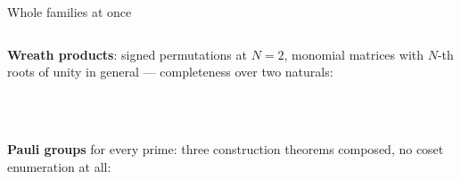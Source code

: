 \begin{frame}{Whole families at once}
\renewcommand{\AgdaCodeStyle}{\footnotesize}
\begin{columns}[c]
\begin{column}{0.58\textwidth}
\textbf{Wreath products}: signed permutations at $N=2$, monomial matrices with
$N$-th roots of unity in general --- completeness over \alert{two naturals}:
\begin{code}%
\>[0]\AgdaSpace{}%
\AgdaSymbol{:}\AgdaSpace{}%
\AgdaSpace{}%
\AgdaSpace{}%
\AgdaSpace{}%
\<%
\\
\>[0][@{}l@{\AgdaIndent{0}}]%
\>[2]\AgdaSymbol{(((}\AgdaSpace{}%
\AgdaSpace{}%
\AgdaSymbol{)}\AgdaSpace{}%
\AgdaSpace{}%
\AgdaSymbol{)}\AgdaSpace{}%
\AgdaSpace{}%
\AgdaSymbol{(}\AgdaSpace{}%
\AgdaSymbol{)}\AgdaSpace{}%
\AgdaSpace{}%
\AgdaSpace{}%
\AgdaSymbol{)}\<%
\\
\>[2][@{}l@{\AgdaIndent{0}}]%
\>[4]\AgdaSpace{}%
\AgdaSymbol{(}\AgdaSpace{}%
\AgdaSpace{}%
\AgdaSymbol{)}\<%
\end{code}
\begin{code}[hide]%
\>[0]\AgdaSpace{}%
\AgdaSpace{}%
\AgdaSpace{}%
\AgdaSymbol{=}\AgdaSpace{}%
\AgdaSpace{}%
\AgdaSpace{}%
\<%
\end{code}
\vspace{4pt}
\textbf{Pauli groups} for every prime: three construction theorems composed,
\alert{no coset enumeration at all}:
\begin{code}%
\>[0]\AgdaSpace{}%
\AgdaSymbol{:}\AgdaSpace{}%
\AgdaSpace{}%
\AgdaSpace{}%
\AgdaSymbol{(}\AgdaSpace{}%
\AgdaSymbol{:}\AgdaSpace{}%
\AgdaSpace{}%
\AgdaSymbol{(}\AgdaSpace{}%
\AgdaSymbol{))}\AgdaSpace{}%
\AgdaSpace{}%
\<%
\\

\end{code}
\end{column}
\end{columns}
\end{frame}
